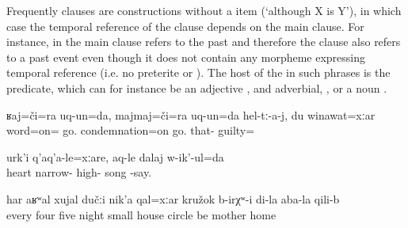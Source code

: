 Frequently  clauses are  constructions without a  item (`although X is Y'), in which case the temporal reference of the  clause depends on the main clause. For instance, in  the main clause refers to the past and therefore the  clause also refers to a past event even though it does not contain any morpheme expressing temporal reference (i.e. no preterite or ). The host of the  in such  phrases is the  predicate, which can for instance be an adjective , and adverbial, , or a noun . 

\begin{exe}
		\ex	\label{ex:‎‎I argued, I quarreled with them, though I was guilty (myself).}
	\gll	ʁaj=či=ra	uq-un=da, majmaj=či=ra	uq-un=da	hel-tː-a-j,	du	winawat=xːar \\
word=on=	go.		condemnation=on	go.	that-		guilty= \\
	\glt	{}
	
	\ex	\label{ex:‎‎Even though the heart is sorrowful (lit. `narrowly'), I sing my song loudly.}
	\gll	urk'i	q'aq'a-le=xːare,		aq-le	dalaj	w-ik'-ul=da \\
heart	narrow-		high-	song	-say.\\
	\glt	{}
	
			\ex	\label{ex:‎‎‎Every fourth or fifth night there was a circle (of people) in my mother's house though it was a small house}
	\gll	har	aʁʷal	xujal	dučːi	nik'a	qal=xːar	kružok	b-irχʷ-i	di-la	aba-la	qili-b\\
		every	four	five	night	small	house	circle	be		mother	home\\
	\glt	{}
\end{exe}

